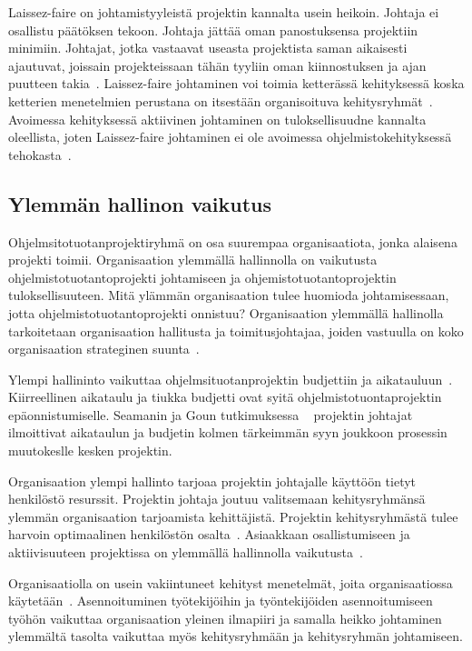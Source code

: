 \documentclass[finnish]{tktltiki2}
\theoremstyle{definition}
\theoremstyle{remark}
\begin{document}
Laissez-faire on johtamistyyleistä projektin kannalta usein heikoin. Johtaja ei osallistu päätöksen tekoon. Johtaja jättää oman panostuksensa projektiin minimiin. Johtajat, jotka vastaavat useasta projektista saman aikaisesti ajautuvat, joissain projekteissaan tähän tyyliin oman kiinnostuksen ja ajan puutteen takia~\cite{Dhomne:2012:ITL:2382887.2382899}. Laissez-faire johtaminen voi toimia ketterässä kehityksessä koska ketterien menetelmien perustana on itsestään organisoituva kehitysryhmät~\cite{fowler2001agile}. Avoimessa kehityksessä aktiivinen johtaminen on tuloksellisuudne kannalta oleellista, joten Laissez-faire johtaminen ei ole avoimessa ohjelmistokehityksessä tehokasta~\cite{Li:2006:MOS:1125170.1125182}.


\subsection{Ylemmän hallinon vaikutus}

Ohjelmsitotuotanprojektiryhmä on osa suurempaa organisaatiota, jonka alaisena projekti toimii. Organisaation ylemmällä hallinnolla on vaikutusta ohjelmistotuotantoprojekti johtamiseen ja ohjemistotuotantoprojektin tuloksellisuuteen. Mitä ylämmän organisaation tulee huomioda johtamisessaan, jotta ohjelmistotuotantoprojekti onnistuu? Organisaation ylemmällä hallinolla tarkoitetaan organisaation hallitusta ja toimitusjohtajaa, joiden vastuulla on koko organisaation strateginen suunta~\cite{McLeod:2011:FAS:1978802.1978803}.

Ylempi hallininto vaikuttaa ohjelmsituotanprojektin budjettiin ja aikatauluun~\cite{McLeod:2011:FAS:1978802.1978803}. Kiirreellinen aikataulu ja tiukka budjetti ovat syitä ohjelmistotuontaprojektin epäonnistumiselle. Seamanin ja Goun tutkimuksessa ~\cite{Guo:2008:SSP:1414004.1414046} projektin johtajat ilmoittivat aikataulun ja budjetin kolmen tärkeimmän syyn joukkoon prosessin muutokeslle kesken projektin. 

Organisaation ylempi hallinto tarjoaa projektin johtajalle käyttöön tietyt henkilöstö resurssit. Projektin johtaja joutuu valitsemaan kehitysryhmänsä ylemmän organisaation tarjoamista kehittäjistä. Projektin kehitysryhmästä tulee harvoin optimaalinen henkilöstön osalta~\cite{Dhomne:2012:ITL:2382887.2382899}. Asiaakkaan osallistumiseen ja aktiivisuuteen projektissa on ylemmällä hallinnolla vaikutusta~\cite{McLeod:2011:FAS:1978802.1978803}.

Organisaatiolla on usein vakiintuneet kehityst menetelmät, joita organisaatiossa käytetään~\cite{McLeod:2011:FAS:1978802.1978803}. Asennoituminen työtekijöihin ja työntekijöiden asennoitumiseen työhön vaikuttaa organisaation yleinen ilmapiiri ja samalla heikko johtaminen ylemmältä tasolta vaikuttaa myös kehitysryhmään ja kehitysryhmän johtamiseen.  
\end{document}
